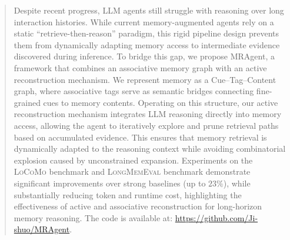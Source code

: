 \begin{abstract}


Despite recent progress, LLM agents still struggle with reasoning over long interaction histories.
While current memory-augmented agents rely on a static ``retrieve-then-reason'' paradigm, this rigid pipeline design prevents them from dynamically adapting memory access to intermediate evidence discovered during inference.
To bridge this gap, we propose MRAgent, a framework that combines an associative memory graph with an active reconstruction mechanism. We represent memory as a Cue–Tag–Content graph, where associative tags serve as semantic bridges connecting fine-grained cues to memory contents.
Operating on this structure, our active reconstruction mechanism integrates LLM reasoning directly into memory access, allowing the agent to iteratively explore and prune retrieval paths based on accumulated evidence. This ensures that memory retrieval is dynamically adapted to the  reasoning context while avoiding combinatorial explosion caused by unconstrained expansion.
Experiments on the \textsc{LoCoMo} benchmark  and \textsc{LongMemEval} benchmark  demonstrate significant improvements over strong baselines (up to $23\%$), while substantially reducing token and runtime cost, highlighting the effectiveness of active and associative reconstruction for long-horizon memory reasoning. The code is available at: \url{https://github.com/Ji-shuo/MRAgent}.



\end{abstract}